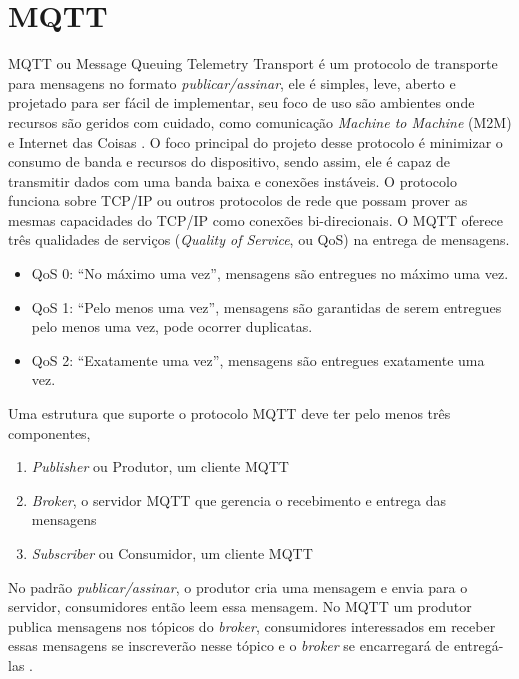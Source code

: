 \section{MQTT}
\label{sec:mqtt}
MQTT ou Message Queuing Telemetry Transport \cite{ISO20922} é um protocolo de transporte para mensagens no formato \emph{publicar/assinar}, ele é simples, leve, aberto e projetado para ser fácil de implementar, seu foco de uso são ambientes onde recursos são geridos com cuidado, como comunicação \emph{Machine to Machine} (M2M) e Internet das Coisas \cite{MQTT5}. O foco principal do projeto desse protocolo é minimizar o consumo de banda e recursos do dispositivo, sendo assim, ele é capaz de transmitir dados com uma banda baixa e conexões instáveis. O protocolo funciona sobre TCP/IP ou outros protocolos de rede que possam prover as mesmas capacidades do TCP/IP como conexões bi-direcionais. O MQTT oferece três qualidades de serviços (\emph{Quality of Service}, ou QoS) na entrega de mensagens.
\begin{itemize}
    \item QoS 0: ``No máximo uma vez'', mensagens são entregues no máximo uma vez.
    \item QoS 1: ``Pelo menos uma vez'', mensagens são garantidas de serem entregues pelo menos uma vez, pode ocorrer duplicatas.
    \item QoS 2: ``Exatamente uma vez'', mensagens são entregues exatamente uma vez.
\end{itemize}
Uma estrutura que suporte o protocolo MQTT deve ter pelo menos três componentes,
\begin{enumerate}
    \item \emph{Publisher} ou Produtor, um cliente MQTT
    \item \emph{Broker}, o servidor MQTT que gerencia o recebimento e entrega das mensagens
    \item \emph{Subscriber} ou Consumidor, um cliente MQTT
\end{enumerate}
No padrão \emph{publicar/assinar}, o produtor cria uma mensagem e envia para o servidor, consumidores então leem essa mensagem. No MQTT um produtor publica mensagens nos tópicos do \emph{broker}, consumidores interessados em receber essas mensagens se inscreverão nesse tópico e o \emph{broker} se encarregará de entregá-las \cite{Mishra2020}.

